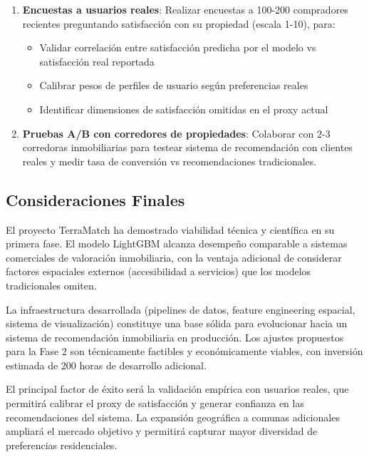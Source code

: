 \begin{enumerate}
    \item \textbf{Encuestas a usuarios reales}: Realizar encuestas a 100-200 compradores recientes preguntando satisfacción con su propiedad (escala 1-10), para:
    \begin{itemize}
        \item Validar correlación entre satisfacción predicha por el modelo vs satisfacción real reportada
        \item Calibrar pesos de perfiles de usuario según preferencias reales
        \item Identificar dimensiones de satisfacción omitidas en el proxy actual
    \end{itemize}
    
    \item \textbf{Pruebas A/B con corredores de propiedades}: Colaborar con 2-3 corredoras inmobiliarias para testear sistema de recomendación con clientes reales y medir tasa de conversión vs recomendaciones tradicionales.
\end{enumerate}



\subsection{Consideraciones Finales}

El proyecto TerraMatch ha demostrado viabilidad técnica y científica en su primera fase. El modelo LightGBM alcanza desempeño comparable a sistemas comerciales de valoración inmobiliaria, con la ventaja adicional de considerar factores espaciales externos (accesibilidad a servicios) que los modelos tradicionales omiten.

La infraestructura desarrollada (pipelines de datos, feature engineering espacial, sistema de visualización) constituye una base sólida para evolucionar hacia un sistema de recomendación inmobiliaria en producción. Los ajustes propuestos para la Fase 2 son técnicamente factibles y económicamente viables, con inversión estimada de 200 horas de desarrollo adicional.

El principal factor de éxito será la validación empírica con usuarios reales, que permitirá calibrar el proxy de satisfacción y generar confianza en las recomendaciones del sistema. La expansión geográfica a comunas adicionales ampliará el mercado objetivo y permitirá capturar mayor diversidad de preferencias residenciales.



\newpage
\printbibliography%



\newpage
\appendix
